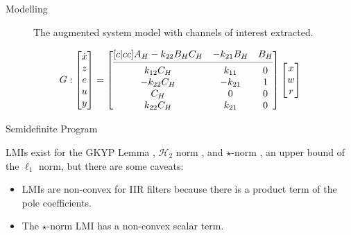 \documentclass[10pt,usenames,dvipsnames]{beamer}
\begin{document}
\begin{frame}{Modelling}
\begin{figure}
	\caption{The augmented system model with channels of interest extracted.}
\end{figure}
\begin{equation*}
	G:
	\begin{bmatrix}
		\dot{x} \\
		z \\
		e \\
		u \\
		y
	\end{bmatrix} =
	\begin{bmatrix}[c|cc]
		A_H - k_{22}B_HC_H & -k_{21}B_H & B_H \\
		\cmidrule(lr){1-3}
		k_{12}C_H & k_{11} & 0 \\
		-k_{22}C_H & -k_{21} & 1 \\
		C_H & 0 & 0 \\
		k_{22}C_H & k_{21} & 0
	\end{bmatrix}
	\begin{bmatrix}
		x \\
		w \\
		r
	\end{bmatrix}
\end{equation*}

\end{frame}

\begin{frame}{Semidefinite Program}

LMIs exist for the GKYP Lemma \cite{Iwasaki2005}, $\mathcal{H}_2$ norm \cite{Masubuchi1998}, and $\star$-norm \cite{Bu2000, Oberoi2005}, an upper bound of the $\ell_1$ norm, but there are some caveats:
\begin{itemize}
	\item LMIs are non-convex for IIR filters because there is a product term of the pole coefficients.
	\item The $\star$-norm LMI has a non-convex scalar term.
\end{itemize}

\end{frame}
\end{document}
